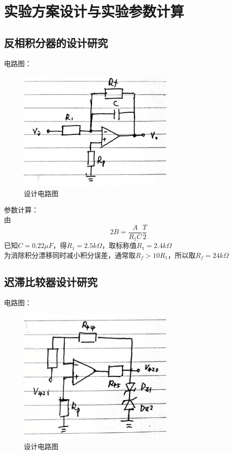 \documentclass{../source/Experiment}
\begin{document}
    \section{实验方案设计与实验参数计算}
        \subsection{反相积分器的设计研究}
            电路图：\\
            \begin{figure}[h]
                \centering
                \includegraphics[width = 3in]{pic/集成2.png}
                \caption{设计电路图}
            \end{figure}

            参数计算：\\
            由
            $$2B = \frac{A}{R_1C}\frac{T}{2}$$
            已知$C = 0.22\mu F$，得$R_1 = 2.5k\Omega$，取标称值$R_1 = 2.4k\Omega$\\
            为消除积分漂移同时减小积分误差，通常取$R_f>10R_1$，所以取$R_f = 24k\Omega$    
        \subsection{迟滞比较器设计研究}
            电路图：\\
            \begin{figure}[h]
                \centering
                \includegraphics[width = 3in]{pic/集成3}
                \caption{设计电路图}
            \end{figure}
\end{document}
